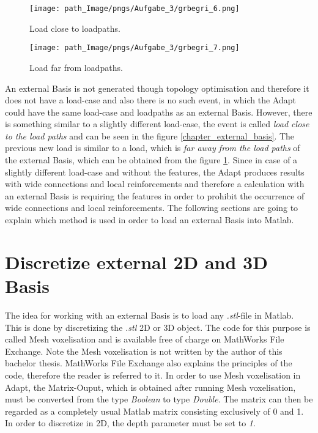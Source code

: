       \begin{figure}[!h]
      \begin{minipage}{0.45\textwidth}
\centering
  \texttt{[image: path\_Image/pngs/Aufgabe\_3/grbegri\_6.png]}
	\caption{Load close to loadpaths.} 
	\label{fig_ext_bas_2}
\end{minipage}
\hfill
\begin{minipage}{0.45\textwidth}
	\centering
  \texttt{[image: path\_Image/pngs/Aufgabe\_3/grbegri\_7.png]}
	\caption{Load far from loadpaths.} 
	\label{fig_ext_bas_3}
\end{minipage}
      \end{figure}
	An external
      Basis is not generated
      though topology optimisation and
      therefore it does not have a load-case and also there is no such
      event, in which the Adapt could have the same load-case and loadpaths as
      an external Basis. However, there is something similar to
      a slightly different load-case, the event is called
     \emph{ load close to the load paths} and can be seen in
      the figure \ref{chapter_external_basis}.
      The 
      previous new load is similar to a load, which is\emph{ far
      away from the load paths} of the external Basis, which
      can be obtained from the figure
      \ref{fig_ext_bas_3}. Since in case of a slightly different load-case
      and without the features,
      the Adapt produces
      results with wide connections and local reinforcements
      and therefore a calculation with an external Basis
      is requiring the features in order to prohibit the
      occurrence of wide connections and local reinforcements.
	The following sections are going to explain
	which method is used
      in order to load an external Basis into Matlab.
      
\section{Discretize external 2D and 3D Basis}
The idea for working with an external Basis is to load any
\emph{.stl}-file in Matlab. This is done by
discretizing the \emph{.stl} 2D or 3D object.
The code for this
purpose is called Mesh voxelisation and 
 is available free of charge on MathWorks File Exchange. Note
 the Mesh voxelisation is not written by the author of this bachelor thesis.
 MathWorks File Exchange also explains  the principles of the code,
 therefore the reader is referred to it.
  In order to use Mesh voxelisation in Adapt, 
  the Matrix-Ouput, which is 
  obtained after running
  Mesh voxelisation,
  must be converted from the type  \textit{Boolean}
   to type \textit{Double}. The
    matrix can then be regarded as a
    completely usual Matlab matrix consisting 
    exclusively of 0 and 1. 
    In order to discretize in 2D, the depth parameter must be set to \textit{1}.

